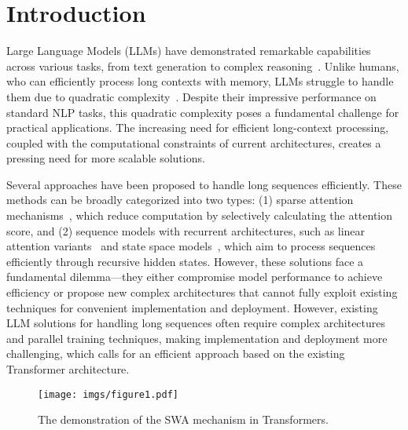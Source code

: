 \section{Introduction}
\label{introduction}



Large Language Models (LLMs) have demonstrated remarkable capabilities across various tasks, from text generation to complex reasoning~\cite{intro}. 
Unlike humans, who can efficiently process long contexts with memory, LLMs struggle to handle them due to quadratic complexity~\cite{Longformer}.
Despite their impressive performance on standard NLP tasks, this quadratic complexity poses a fundamental challenge for practical applications. The increasing need for efficient long-context processing, coupled with the computational constraints of current architectures, creates a pressing need for more scalable solutions.

Several approaches have been proposed to handle long sequences efficiently. These methods can be broadly categorized into two types: (1) sparse attention mechanisms~\cite{Longformer}, which reduce computation by selectively calculating the attention score, and (2) sequence models with recurrent architectures, such as linear attention variants~\cite{lineartransformer} and state space models~\cite{mamba}, which aim to process sequences efficiently through recursive hidden states.
However, these solutions face a fundamental dilemma---they either compromise model performance to achieve efficiency or propose new complex architectures that cannot fully exploit existing techniques for convenient implementation and deployment.
However, existing LLM solutions for handling long sequences often require complex architectures and parallel training techniques, making implementation and deployment more challenging, which calls for an efficient approach based on the existing Transformer architecture.

\begin{figure*}[ht]
    \hfill
    \texttt{[image: imgs/figure1.pdf]}
    \caption{The demonstration of the SWA mechanism in Transformers.}
    \label{fig:swa}
\end{figure*}


